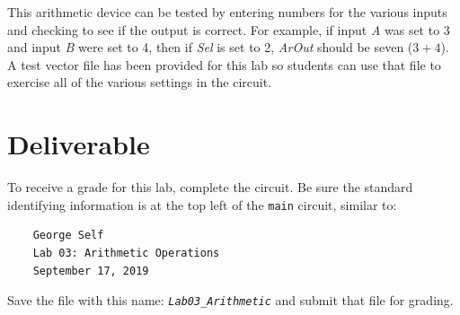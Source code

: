 This arithmetic device can be tested by entering numbers for the various inputs and checking to see if the output is correct. For example, if input \textit{A} was set to 3 and input \textit{B} were set to 4, then if \textit{Sel} is set to 2, \textit{ArOut} should be seven ($ 3+4 $). A test vector file has been provided for this lab so students can use that file to exercise all of the various settings in the circuit.

\section{Deliverable}

To receive a grade for this lab, complete the circuit. Be sure the standard identifying information is at the top left of the \lstinline[columns=fixed]|main| circuit, similar to: 

\bigskip
\begin{minipage}{\linewidth}
	\begin{verbatim}
	George Self
	Lab 03: Arithmetic Operations
	September 17, 2019
	\end{verbatim}
\end{minipage}
\bigskip

Save the file with this name: \emph{\texttt{Lab03\_Arithmetic}} and submit that file for grading.

